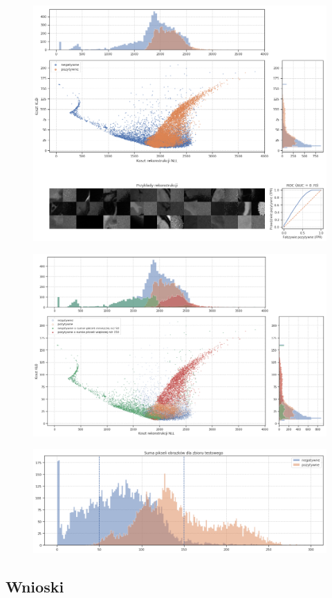 \begin{figure}[h!]
    \centering
    \includegraphics[width=1.0\textwidth]{images/soft_vae_v2}
    \caption{}
    \label{fig:soft_vae}
\end{figure}

\begin{figure}[h!]
    \centering
    \includegraphics[width=1.0\textwidth]{images/soft_vae_th_v2}
    \caption{}
    \label{fig:soft_vae_th}
\end{figure}

\begin{figure}[h!]
    \centering
    \includegraphics[width=1.0\textwidth]{images/pixels_hist_v2}
    \caption{}
    \label{fig:pixels_hist}
\end{figure}

\subsection{Wnioski}





